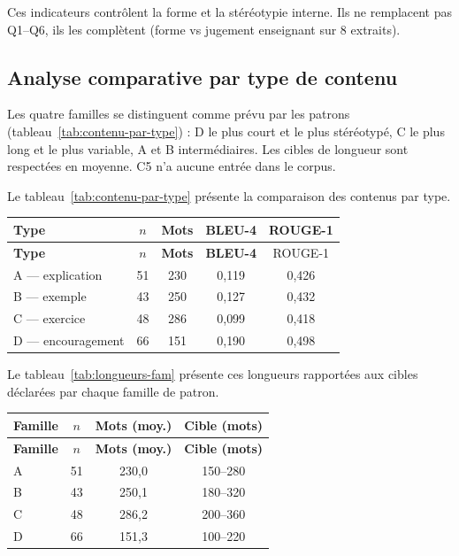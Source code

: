 Ces indicateurs contrôlent la forme et la stéréotypie interne.
Ils ne remplacent pas Q1--Q6, ils les complètent (forme vs jugement
enseignant sur 8 extraits).

\subsection{Analyse comparative par type de contenu}

Les quatre familles se distinguent comme prévu par les patrons
(tableau~\ref{tab:contenu-par-type}) : D le plus court et le plus
stéréotypé, C le plus long et le plus variable, A et B intermédiaires.
Les cibles de longueur sont respectées en moyenne. C5 n'a aucune entrée
dans le corpus.

Le tableau~\ref{tab:contenu-par-type} présente la comparaison des contenus par type.

{\small
\renewcommand{\arraystretch}{1.18}
\setlength{\tabcolsep}{4pt}
\begin{xltabular}{\textwidth}{|>{\raggedright\arraybackslash}X|c|c|c|c|}
\hline
{}
\textbf{Type} & \textbf{$n$} & \textbf{Mots} & \textbf{BLEU-4} &
ROUGE-1 \\
\hline
\endfirsthead
\hline
{}
\textbf{Type} & \textbf{$n$} & \textbf{Mots} & \textbf{BLEU-4} &
ROUGE-1 \\
\hline
\endhead
\endfoot
\endlastfoot
A --- explication & 51 & 230 & 0{,}119 & 0{,}426 \\
\hline
B --- exemple & 43 & 250 & 0{,}127 & 0{,}432 \\
\hline
C --- exercice & 48 & 286 & 0{,}099 & 0{,}418 \\
\hline
D --- encouragement & 66 & 151 & 0{,}190 & 0{,}498 \\
\hline
\end{xltabular}
\label{tab:contenu-par-type}
}

Le tableau~\ref{tab:longueurs-fam} présente ces longueurs rapportées aux
cibles déclarées par chaque famille de patron.

{\small
\renewcommand{\arraystretch}{1.18}
\setlength{\tabcolsep}{4pt}
\begin{xltabular}{\textwidth}{|>{\raggedright\arraybackslash}X|c|c|c|}
\hline
{}
\textbf{Famille} & \textbf{$n$} & \textbf{Mots (moy.)} & \textbf{Cible (mots)} \\
\hline
\endfirsthead
\hline
{}
\textbf{Famille} & \textbf{$n$} & \textbf{Mots (moy.)} & \textbf{Cible (mots)} \\
\hline
\endhead
\endfoot
\endlastfoot
A & 51 & 230{,}0 & 150--280 \\
\hline
B & 43 & 250{,}1 & 180--320 \\
\hline
C & 48 & 286{,}2 & 200--360 \\
\hline
D & 66 & 151{,}3 & 100--220 \\
\hline
\end{xltabular}
\label{tab:longueurs-fam}
}

